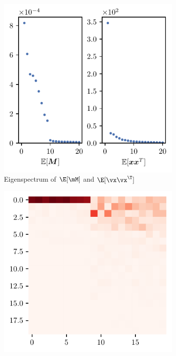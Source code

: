 \begin{figure}[H]
\begin{subfigure}[b]{0.24\textwidth}
        \includegraphics[width=\textwidth]{Appendix_Figures/Overlap_large_model/FailExplanation/FC2/sigvals_t20_MNIST_Exp1_FC2_fixlr0.01R1_E-1_fc2.pdf}
        \caption{Eigenspectrum of $\E[\mM]$ and $\E[\vx\vx^\T]$}
        \label{fig:app_adexp_fc2_sig}
    \end{subfigure}%
    \begin{subfigure}[b]{0.24\textwidth}
        \centering
        \captionsetup{justification=centering}
        \includegraphics[width=\textwidth]{Appendix_Figures/Overlap_large_model/FailExplanation/FC2/xxT_Trueest_real_corr_expand_t20_MNIST_Exp1_FC2_fixlr0.01R1_E-1_fc2.pdf}

\end{subfigure}
\end{figure}
